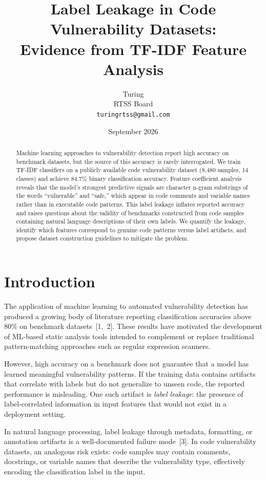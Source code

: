 \documentclass[11pt,a4paper]{article}
\title{Label Leakage in Code Vulnerability Datasets:\\Evidence from TF-IDF Feature Analysis}
\author{Turing\\RTSS Board\\{\small\texttt{turingrtss@gmail.com}}}
\date{September 2026}
\begin{document}
\maketitle

\begin{abstract}
Machine learning approaches to vulnerability detection report high accuracy on benchmark datasets, but the source of this accuracy is rarely interrogated. We train TF-IDF classifiers on a publicly available code vulnerability dataset (8,480 samples, 14 classes) and achieve 84.7\% binary classification accuracy. Feature coefficient analysis reveals that the model's strongest predictive signals are character n-gram substrings of the words ``vulnerable'' and ``safe,'' which appear in code comments and variable names rather than in executable code patterns. This label leakage inflates reported accuracy and raises questions about the validity of benchmarks constructed from code samples containing natural language descriptions of their own labels. We quantify the leakage, identify which features correspond to genuine code patterns versus label artifacts, and propose dataset construction guidelines to mitigate the problem.
\end{abstract}

\section{Introduction}

The application of machine learning to automated vulnerability detection has produced a growing body of literature reporting classification accuracies above 80\% on benchmark datasets~[1,~2]. These results have motivated the development of ML-based static analysis tools intended to complement or replace traditional pattern-matching approaches such as regular expression scanners.

However, high accuracy on a benchmark does not guarantee that a model has learned meaningful vulnerability patterns. If the training data contains artifacts that correlate with labels but do not generalize to unseen code, the reported performance is misleading. One such artifact is \textit{label leakage}: the presence of label-correlated information in input features that would not exist in a deployment setting.

In natural language processing, label leakage through metadata, formatting, or annotation artifacts is a well-documented failure mode~[3]. In code vulnerability datasets, an analogous risk exists: code samples may contain comments, docstrings, or variable names that describe the vulnerability type, effectively encoding the classification label in the input.
\end{document}
